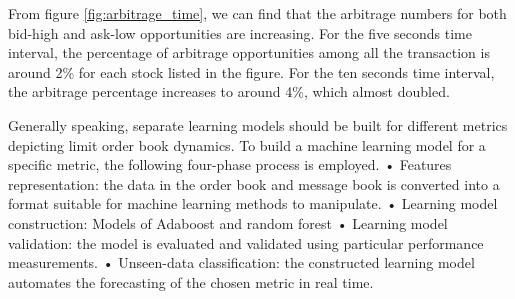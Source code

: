 From figure \ref{fig:arbitrage_time}, we can find that the arbitrage numbers for both bid-high and ask-low opportunities are increasing. For the five seconds time interval, the percentage of arbitrage opportunities among all the transaction is around 2\% for each stock listed in the figure. For the ten seconds time interval, the arbitrage percentage increases to around 4\%, which almost doubled. 

Generally speaking, separate learning models should be built for different metrics
depicting limit order book dynamics. To build a machine learning model for a specific
metric, the following four-phase process is employed.
• Features representation: the data in the order book and message book is
converted into a format suitable for machine learning methods to manipulate.
• Learning model construction: Models of Adaboost and random forest 
• Learning model validation: the model is evaluated and validated using particular performance measurements.
• Unseen-data classification: the constructed learning model automates the
forecasting of the chosen metric in real time.


